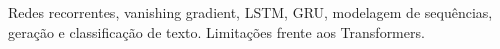 
Redes recorrentes, vanishing gradient, LSTM, GRU, modelagem de sequências, geração e classificação de texto. Limitações frente aos Transformers.

